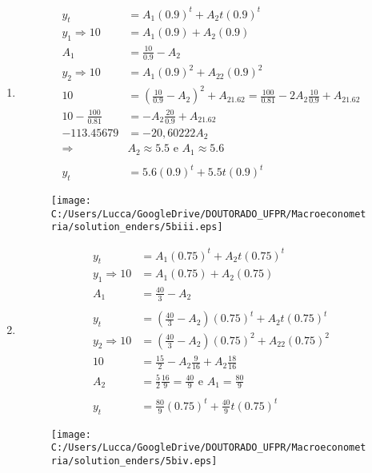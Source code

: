 \begin{enumerate}
\begin{enumerate}
\begin{enumerate}
	\item %
	
	\begin{align*}
		y_t&=A_1(0.9)^t+A_2t(0.9)^t\\
	y_1	\Rightarrow 10&=A_1(0.9)+A_2(0.9)\\
		A_1&=\frac{10}{0.9}-A_2\\
	y_2 \Rightarrow 10&=A_1(0.9)^2+A_22(0.9)^2\\
		10&=(\frac{10}{0.9}-A_2)^2+A_21.62=\frac{100}{0.81}-2A_2\frac{10}{0.9}+A_21.62\\
		10-\frac{100}{0.81}&=-A_2\frac{20}{0.9}+A_21.62\\
		-113.45679&=-20,60222A_2\\
		\Rightarrow &A_2\approx 5.5 \text{ e } A_1\approx5.6\\
		\\
		y_t&=5.6(0.9)^t+5.5t(0.9)^t
	\end{align*}
	
	\begin{figure}[h]
		\centering
		\texttt{[image: C:/Users/Lucca/GoogleDrive/DOUTORADO\_UFPR/Macroeconometria/solution\_enders/5biii.eps]}
	\end{figure}
	
	\item %
	
	\begin{align*}
		y_t&=A_1(0.75)^t+A_2t(0.75)^t\\
		y_1\Rightarrow 10&=A_1(0.75)+A_2(0.75)\\
		A_1&=\frac{40}{3}-A_2\\
		\\
		y_t&=(\frac{40}{3}-A_2)(0.75)^t+A_2t(0.75)^t\\
		y_2 \Rightarrow 10&=(\frac{40}{3}-A_2)(0.75)^2+A_22(0.75)^2\\
		10&=\frac{15}{2}-A_2\frac{9}{16}+A_2\frac{18}{16}\\
		A_2&=\frac{5}{2}\frac{16}{9}=\frac{40}{9} \text{ e } A_1=\frac{80}{9}\\
		\\
		y_t&=\frac{80}{9}(0.75)^t+\frac{40}{9}t(0.75)^t
	\end{align*}
	
	\begin{figure}[h]
		\centering
		\texttt{[image: C:/Users/Lucca/GoogleDrive/DOUTORADO\_UFPR/Macroeconometria/solution\_enders/5biv.eps]}
	\end{figure}
	
\end{enumerate}
	

\end{enumerate}
\end{enumerate}
